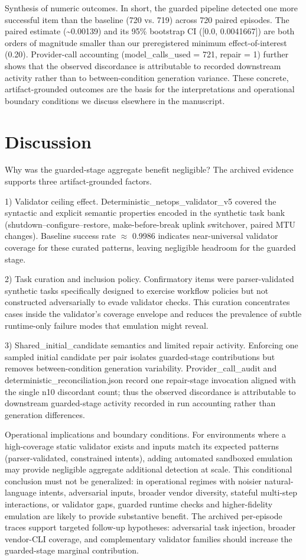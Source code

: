 \documentclass[conference]{IEEEtran}
\begin{document}
Synthesis of numeric outcomes. In short, the guarded pipeline detected one more successful item than the baseline (720 vs. 719) across 720 paired episodes. The paired estimate (\textasciitilde{}0.00139) and its 95\% bootstrap CI ([0.0, 0.0041667]) are both orders of magnitude smaller than our preregistered minimum effect-of-interest (0.20). Provider-call accounting (model\_calls\_used = 721, repair = 1) further shows that the observed discordance is attributable to recorded downstream activity rather than to between-condition generation variance. These concrete, artifact-grounded outcomes are the basis for the interpretations and operational boundary conditions we discuss elsewhere in the manuscript.

\section{Discussion}
Why was the guarded-stage aggregate benefit negligible? The archived evidence supports three artifact-grounded factors.

1) Validator ceiling effect. Deterministic\_netops\_validator\_v5 covered the syntactic and explicit semantic properties encoded in the synthetic task bank (shutdown--configure--restore, make-before-break uplink switchover, paired MTU changes). Baseline success rate \ensuremath{\approx} 0.9986 indicates near-universal validator coverage for these curated patterns, leaving negligible headroom for the guarded stage.

2) Task curation and inclusion policy. Confirmatory items were parser-validated synthetic tasks specifically designed to exercise workflow policies but not constructed adversarially to evade validator checks. This curation concentrates cases inside the validator's coverage envelope and reduces the prevalence of subtle runtime-only failure modes that emulation might reveal.

3) Shared\_initial\_candidate semantics and limited repair activity. Enforcing one sampled initial candidate per pair isolates guarded-stage contributions but removes between-condition generation variability. Provider\_call\_audit and deterministic\_reconciliation.json record one repair-stage invocation aligned with the single n10 discordant count; thus the observed discordance is attributable to downstream guarded-stage activity recorded in run accounting rather than generation differences.

Operational implications and boundary conditions. For environments where a high-coverage static validator exists and inputs match its expected patterns (parser-validated, constrained intents), adding automated sandboxed emulation may provide negligible aggregate additional detection at scale. This conditional conclusion must not be generalized: in operational regimes with noisier natural-language intents, adversarial inputs, broader vendor diversity, stateful multi-step interactions, or validator gaps, guarded runtime checks and higher-fidelity emulation are likely to provide substantive benefit. The archived per-episode traces support targeted follow-up hypotheses: adversarial task injection, broader vendor-CLI coverage, and complementary validator families should increase the guarded-stage marginal contribution.
\end{document}
